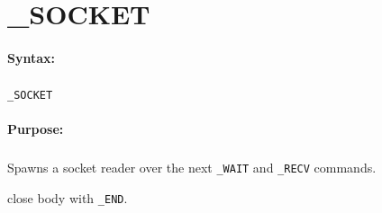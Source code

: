 
\newpage
\section{\_SOCKET}
\label{cmd:_SOCKET}

\paragraph{Syntax:}
\subparagraph{}
\texttt{\_SOCKET}

\paragraph{Purpose:}
\subparagraph{}
Spawns a socket reader over the next \texttt{\_WAIT} and \texttt{\_RECV} commands.

close body with \texttt{\_END}.

